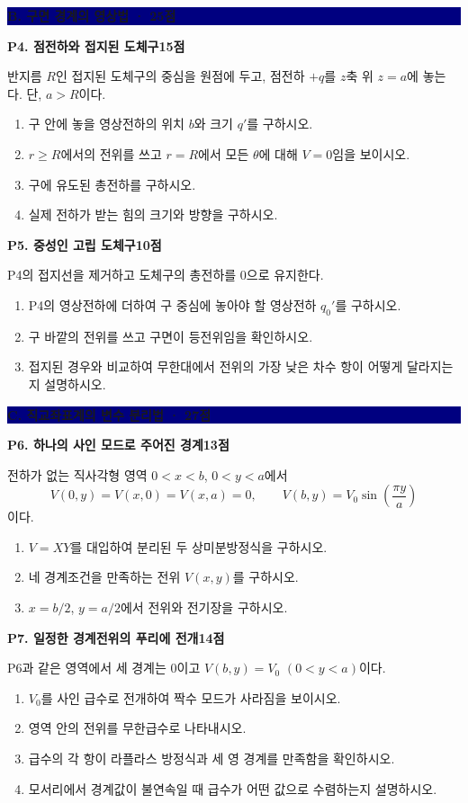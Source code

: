 \documentclass[10pt,a4paper]{article}
\newcommand{\problem}[3]{%
  \needspace{0.18\textheight}
  \par\vspace{2.2mm}
  {\large\bfseries\color{navy}#1\hfill{\normalsize\color{blue}#2점}}\par
  \smallskip #3\par
}
\newcommand{\sectionbar}[1]{%
  \par\vspace{2.5mm}
  \colorbox{navy}{\parbox{0.965\linewidth}{\color{white}\bfseries\large #1}}
  \par\vspace{0.5mm}
}
\begin{document}
\sectionbar{B. 구면 경계의 영상법 · 25점}

\problem{P4. 점전하와 접지된 도체구}{15}{%
반지름 $R$인 접지된 도체구의 중심을 원점에 두고, 점전하 $+q$를 $z$축 위 $z=a$에 놓는다. 단, $a>R$이다.
\begin{enumerate}[label=(\alph*)]
  \item 구 안에 놓을 영상전하의 위치 $b$와 크기 $q'$를 구하시오.
  \item $r\ge R$에서의 전위를 쓰고 $r=R$에서 모든 $\theta$에 대해 $V=0$임을 보이시오.
  \item 구에 유도된 총전하를 구하시오.
  \item 실제 전하가 받는 힘의 크기와 방향을 구하시오.
\end{enumerate}
}

\problem{P5. 중성인 고립 도체구}{10}{%
P4의 접지선을 제거하고 도체구의 총전하를 0으로 유지한다.
\begin{enumerate}[label=(\alph*)]
  \item P4의 영상전하에 더하여 구 중심에 놓아야 할 영상전하 $q_0'$를 구하시오.
  \item 구 바깥의 전위를 쓰고 구면이 등전위임을 확인하시오.
  \item 접지된 경우와 비교하여 무한대에서 전위의 가장 낮은 차수 항이 어떻게 달라지는지 설명하시오.
\end{enumerate}
}

\sectionbar{C. 직교좌표계의 변수 분리법 · 27점}

\problem{P6. 하나의 사인 모드로 주어진 경계}{13}{%
전하가 없는 직사각형 영역 $0<x<b$, $0<y<a$에서
\[
V(0,y)=V(x,0)=V(x,a)=0,
\qquad V(b,y)=V_0\sin\!\left(\frac{\pi y}{a}\right)
\]
이다.
\begin{enumerate}[label=(\alph*)]
  \item $V=XY$를 대입하여 분리된 두 상미분방정식을 구하시오.
  \item 네 경계조건을 만족하는 전위 $V(x,y)$를 구하시오.
  \item $x=b/2$, $y=a/2$에서 전위와 전기장을 구하시오.
\end{enumerate}
}

\problem{P7. 일정한 경계전위의 푸리에 전개}{14}{%
P6과 같은 영역에서 세 경계는 0이고 $V(b,y)=V_0$ $(0<y<a)$이다.
\begin{enumerate}[label=(\alph*)]
  \item $V_0$를 사인 급수로 전개하여 짝수 모드가 사라짐을 보이시오.
  \item 영역 안의 전위를 무한급수로 나타내시오.
  \item 급수의 각 항이 라플라스 방정식과 세 영 경계를 만족함을 확인하시오.
  \item 모서리에서 경계값이 불연속일 때 급수가 어떤 값으로 수렴하는지 설명하시오.
\end{enumerate}
}
\end{document}
